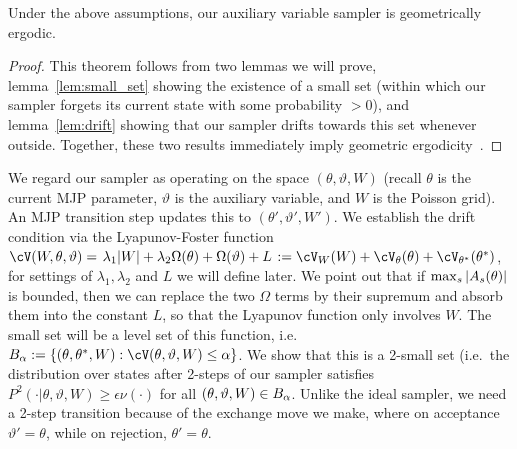 

\begin{theorem}
Under the above assumptions, our auxiliary variable sampler is
geometrically ergodic.  \label{thm:geom_erg} 
\end{theorem}
\begin{proof}
\noindent This theorem follows from two lemmas we will prove, 
lemma~\ref{lem:small_set} showing the existence of a small set (within 
which our sampler forgets its 
current state with some probability $>0$), and lemma~\ref{lem:drift}
showing that our sampler drifts towards this set whenever 
outside. Together, these two results immediately imply geometric 
ergodicity~\citep[Theorems 15.0.1 and Lemma 15.2.8]{meyn2012markov}.
\end{proof}
We regard our sampler as operating on the space $(\theta,\vartheta,W)$ 
(recall $\theta$ is the current MJP parameter, $\vartheta$ is the 
auxiliary variable, and $W$ is the Poisson grid). An MJP transition step 
updates this to $(\theta',\vartheta',W')$. 
We establish the drift condition via the Lyapunov-Foster function
$\cV(W,\theta,\vartheta) = \left. \lambda_1|W| + \lambda_2 \Omega(\theta) +
\Omega(\vartheta) +L \right. := \cV_W(W) + \cV_{\theta}(\theta) + 
\cV_{\theta^*}(\theta^*)$, for settings of $\lambda_1,
  \lambda_2$ and $L$ we will define later.
We point out that if ${\max_s |A_s(\theta)|}$ is bounded, then we can replace
the two $\Omega$ terms by their supremum and absorb them into the 
constant $L$, so that the Lyapunov function only involves $W$.
The small set will be a level set of this function, i.e.\ 
$B_\alpha := \{(\theta,\theta^*,W): \cV(\theta,\vartheta,W) \le \alpha\}$.
We show that this is a 2-small set (i.e.\ the distribution over states
after 2-steps of our sampler satisfies $P^2(\cdot|\theta,\vartheta,W) 
\ge \epsilon \nu(\cdot)$ for all $(\theta,\vartheta,W) \in B_\alpha$. 
Unlike the ideal sampler, we need a 2-step transition because of the 
exchange move we make, 
where on acceptance $\vartheta'=\theta$, while on rejection, $\theta'=\theta$.


